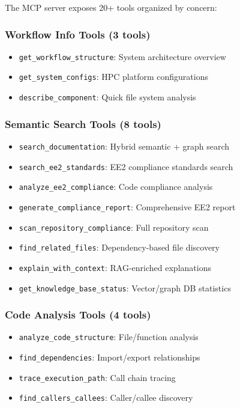 \documentclass[11pt,letterpaper]{article}
\begin{document}
The MCP server exposes 20+ tools organized by concern:

\subsubsection{Workflow Info Tools (3 tools)}
\begin{itemize}
    \item \texttt{get\_workflow\_structure}: System architecture overview
    \item \texttt{get\_system\_configs}: HPC platform configurations
    \item \texttt{describe\_component}: Quick file system analysis
\end{itemize}

\subsubsection{Semantic Search Tools (8 tools)}
\begin{itemize}
    \item \texttt{search\_documentation}: Hybrid semantic + graph search
    \item \texttt{search\_ee2\_standards}: EE2 compliance standards search
    \item \texttt{analyze\_ee2\_compliance}: Code compliance analysis
    \item \texttt{generate\_compliance\_report}: Comprehensive EE2 report
    \item \texttt{scan\_repository\_compliance}: Full repository scan
    \item \texttt{find\_related\_files}: Dependency-based file discovery
    \item \texttt{explain\_with\_context}: RAG-enriched explanations
    \item \texttt{get\_knowledge\_base\_status}: Vector/graph DB statistics
\end{itemize}

\subsubsection{Code Analysis Tools (4 tools)}
\begin{itemize}
    \item \texttt{analyze\_code\_structure}: File/function analysis
    \item \texttt{find\_dependencies}: Import/export relationships
    \item \texttt{trace\_execution\_path}: Call chain tracing
    \item \texttt{find\_callers\_callees}: Caller/callee discovery
\end{itemize}
\end{document}

